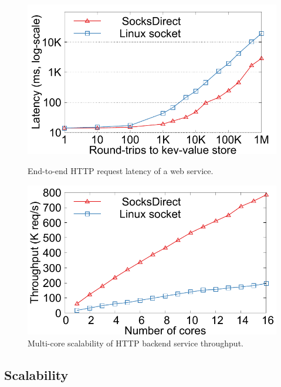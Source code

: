 \begin{figure}[t!]
\begin{minipage}{.31\textwidth}
		\centering \includegraphics[width=\textwidth]{eval/microbenchmark/nginx-multiround-tput.pdf}
		\vspace{-15pt}
		\caption{End-to-end HTTP request latency of a web service.}
		\label{fig:eval-nginx-multiround}
		
		\centering
		\includegraphics[width=\textwidth]{eval/microbenchmark/corenum-http-tput.pdf}
		\vspace{-15pt}
		\caption{Multi-core scalability of HTTP backend service throughput.}
		\label{fig:eval-http-tput}
	\end{minipage}
\vspace{-10pt}
\end{figure}

\subsection{Scalability}


